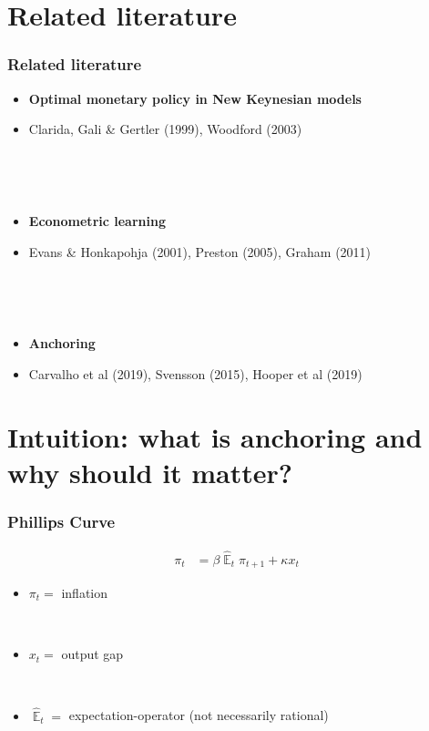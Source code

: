 \documentclass{beamer}
\DeclareMathOperator{\E}{\mathbb{E}}
\begin{document}
\section{Related literature}
\begin{frame}
	\frametitle{Related literature}

\begin{itemize}
\item \textbf{Optimal monetary policy in New Keynesian models}
\item[] Clarida, Gali \& Gertler (1999), Woodford (2003)

\

\

\item \textbf{Econometric learning}
\item[] Evans \& Honkapohja (2001), Preston (2005), Graham (2011)

\

\

\item \textbf{Anchoring} 
\item[] Carvalho et al (2019), Svensson (2015), Hooper et al (2019)
\end{itemize}



\end{frame}

\section{Intuition: what is anchoring and why should it matter?}
\begin{frame}
	\frametitle{Phillips Curve}

\begin{align*}
\pi_t & = \beta \hat{\E}_t\pi_{t+1} + \kappa x_t
\end{align*}

\begin{itemize}
\item $\pi_t = $ inflation

\

\item $x_t =$ output gap

\

\item $\hat{\E}_t =$ expectation-operator (not necessarily rational)


\end{itemize}



\end{frame}
\end{document}
